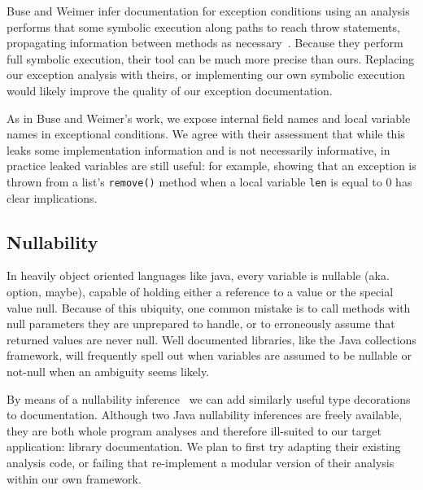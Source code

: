 Buse and Weimer infer documentation for exception conditions
using an analysis performs that some symbolic execution along paths to reach throw
statements, propagating information between methods as necessary~\cite{autodoc}.
Because they
perform full symbolic execution, their tool can be much more precise than ours.
Replacing our exception analysis with theirs, or implementing our own symbolic
execution would likely improve the quality of our exception documentation.  

As in Buse and Weimer's work, we expose internal field names and
local variable names in exceptional conditions.  We agree with their assessment
that while this leaks some
implementation information and is not necessarily informative, in practice
leaked variables are still useful: for example, showing that an exception is
thrown from a list's \texttt{remove()} method when a local variable \texttt{len}
is equal to 0 has clear implications.

\subsection{Nullability}
\label{sec:Nullability}

In heavily object oriented languages like java, every variable is nullable
(aka. option, maybe), capable of holding either a reference to a value or the
special value null.  Because of this ubiquity, one common mistake is to call
methods with null parameters they are unprepared to handle, or to erroneously
assume that returned values are never null.  Well documented libraries, like
the Java collections framework, will frequently spell out when variables are
assumed to be nullable or not-null when an ambiguity seems likely.

By means of a nullability inference~\cite{NIT,NonNullTypeInference} we can add
similarly useful type decorations to documentation.  Although two Java
nullability inferences are freely available, they are both whole program
analyses and therefore ill-suited to our target application: library
documentation.  We plan to first try adapting their existing analysis code, or
failing that re-implement a modular version of their analysis within our own
framework.

